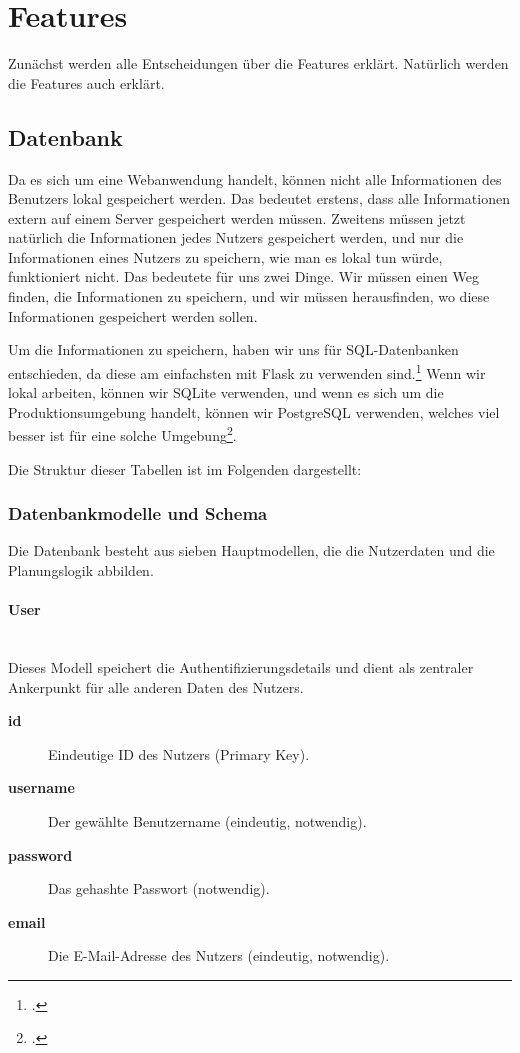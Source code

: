 \documentclass[12pt,a4paper]{report}
\newcommand{\myparagraph}[1]{\paragraph{#1}\mbox{}\\}
\begin{document}
\section{Features}
Zunächst werden alle Entscheidungen über die Features erklärt. Natürlich werden die Features auch erklärt.

\subsection{Datenbank}
Da es sich um eine Webanwendung handelt, können nicht alle Informationen des Benutzers lokal gespeichert werden. Das bedeutet erstens, dass alle Informationen extern auf einem Server gespeichert werden müssen. Zweitens müssen jetzt natürlich die Informationen jedes Nutzers gespeichert werden, und nur die Informationen eines Nutzers zu speichern, wie man es lokal tun würde, funktioniert nicht. Das bedeutete für uns zwei Dinge. Wir müssen einen Weg finden, die Informationen zu speichern, und wir müssen herausfinden, wo diese Informationen gespeichert werden sollen.

Um die Informationen zu speichern, haben wir uns für SQL-Datenbanken entschieden, da diese am einfachsten mit Flask zu verwenden sind.\footcite{flask_database_tutorial} Wenn wir lokal arbeiten, können wir SQLite verwenden, und wenn es sich um die Produktionsumgebung handelt, können wir PostgreSQL verwenden, welches viel besser ist für eine solche Umgebung\footcite{astera_postgres_vs_sqlite}.

Die Struktur dieser Tabellen ist im Folgenden dargestellt:

\subsubsection{Datenbankmodelle und Schema}

Die Datenbank besteht aus sieben Hauptmodellen, die die Nutzerdaten und die Planungslogik abbilden.

\myparagraph{User}
Dieses Modell speichert die Authentifizierungsdetails und dient als zentraler Ankerpunkt für alle anderen Daten des Nutzers.
\begin{description}
    \item[\textbf{id}] Eindeutige ID des Nutzers (Primary Key).
    \item[\textbf{username}] Der gewählte Benutzername (eindeutig, notwendig).
    \item[\textbf{password}] Das gehashte Passwort (notwendig).
    \item[\textbf{email}] Die E-Mail-Adresse des Nutzers (eindeutig, notwendig).
\end{description}
\end{document}
